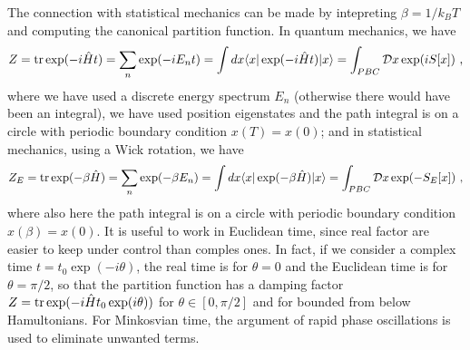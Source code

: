     The connection with statistical mechanics can be made by intepreting $\beta = 1 / k_B T$ and computing the canonical partition function. In quantum mechanics, we have
    \begin{equation*}
        Z = \operatorname{tr} \exp(- i \hat H t) = \sum_n \exp(-i E_n t) = \int dx \langle x\vert \exp(- i \hat H t) \vert x\rangle = \int_{PBC} \mathcal D x \exp (i S [x]) ~,
    \end{equation*}
    where we have used a discrete energy spectrum $E_n$ (otherwise there would have been an integral), we have used position eigenstates and the path integral is on a circle with periodic boundary condition $x(T) = x(0)$; and in statistical mechanics, using a Wick rotation, we have 
    \begin{equation*}
        Z_E = \operatorname{tr} \exp(- \beta \hat H) = \sum_n \exp (-\beta E_n) = \int dx \langle x\vert \exp(- \beta \hat H) \vert x\rangle = \int_{PBC} \mathcal D x \exp (- S_E [x]) ~,
    \end{equation*}
    where also here the path integral is on a circle with periodic boundary condition $x(\beta) = x(0)$. It is useful to work in Euclidean time, since real factor are easier to keep under control than comples ones. In fact, if we consider a complex time $ t = t_0 \exp (- i \theta)$, the real time is for $\theta = 0$ and the Euclidean time is for $\theta = \pi / 2$, so that the partition function has a damping factor $ Z = \operatorname{tr} \exp(- i \hat H t_0 \exp(i \theta))$ for $\theta \in [0, \pi/2]$ and for bounded from below Hamultonians. For Minkosvian time, the argument of rapid phase oscillations is used to eliminate unwanted terms.

